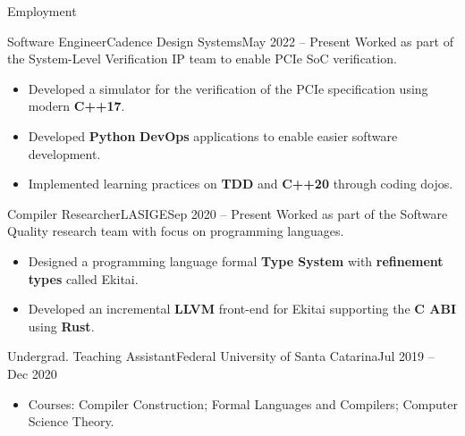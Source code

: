 \documentclass[calibri]{mcdowellcv}
\begin{document}
	\begin{cvsection}{Employment}
		\begin{cvsubsectionxp}{Software Engineer}{Cadence Design Systems}{May 2022 -- Present}
			Worked as part of the System-Level Verification IP team to enable PCIe SoC verification.
			\begin{itemize}
				\item Developed a simulator for the verification of the PCIe specification using modern \textbf{C++17}.
				\item Developed \textbf{Python} \textbf{DevOps} applications to enable easier software development.
				\item Implemented learning practices on \textbf{TDD} and \textbf{C++20} through coding dojos.
			\end{itemize}
		\end{cvsubsectionxp}

		\begin{cvsubsectionxp}{Compiler Researcher}{LASIGE}{Sep 2020 -- Present}
			Worked as part of the Software Quality research team with focus on programming languages.
			\begin{itemize}
				\item Designed a programming language formal \textbf{Type System} with \textbf{refinement types} called Ekitai.
				\item Developed an incremental \textbf{LLVM} front-end for Ekitai supporting the \textbf{C ABI} using \textbf{Rust}.
			\end{itemize}
		\end{cvsubsectionxp}

		\begin{cvsubsectionxp}{Undergrad. Teaching Assistant}{Federal University of Santa Catarina}{Jul 2019 -- Dec 2020}
			\begin{itemize}
				\item Courses: Compiler Construction; Formal Languages and Compilers; Computer Science Theory.
			\end{itemize}
		\end{cvsubsectionxp}


\end{cvsection}
\end{document}

